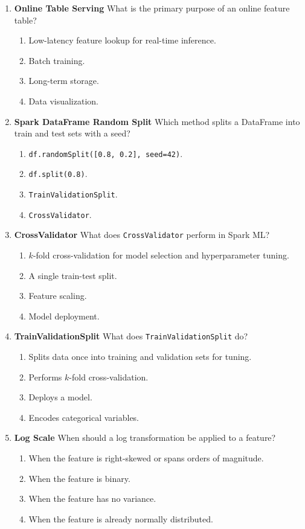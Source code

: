 \documentclass{article}
\begin{document}
\begin{enumerate}[label=\textbf{Q\arabic*.}]
		\item \textbf{Online Table Serving}
		What is the primary purpose of an online feature table?
		\begin{enumerate}[label=\Alph*.]
			\item Low-latency feature lookup for real-time inference.
			\item Batch training.
			\item Long-term storage.
			\item Data visualization.
		\end{enumerate}
		
		\item \textbf{Spark DataFrame Random Split}
		Which method splits a DataFrame into train and test sets with a seed?
		\begin{enumerate}[label=\Alph*.]
			\item \texttt{df.randomSplit([0.8, 0.2], seed=42)}.
			\item \texttt{df.split(0.8)}.
			\item \texttt{TrainValidationSplit}.
			\item \texttt{CrossValidator}.
		\end{enumerate}
		
		\item \textbf{CrossValidator}
		What does \texttt{CrossValidator} perform in Spark ML?
		\begin{enumerate}[label=\Alph*.]
			\item $k$-fold cross-validation for model selection and hyperparameter tuning.
			\item A single train-test split.
			\item Feature scaling.
			\item Model deployment.
		\end{enumerate}
		
		\item \textbf{TrainValidationSplit}
		What does \texttt{TrainValidationSplit} do?
		\begin{enumerate}[label=\Alph*.]
			\item Splits data once into training and validation sets for tuning.
			\item Performs $k$-fold cross-validation.
			\item Deploys a model.
			\item Encodes categorical variables.
		\end{enumerate}
		
		\item \textbf{Log Scale}
		When should a log transformation be applied to a feature?
		\begin{enumerate}[label=\Alph*.]
			\item When the feature is right-skewed or spans orders of magnitude.
			\item When the feature is binary.
			\item When the feature has no variance.
			\item When the feature is already normally distributed.
		\end{enumerate}
		

\end{enumerate}
\end{document}

